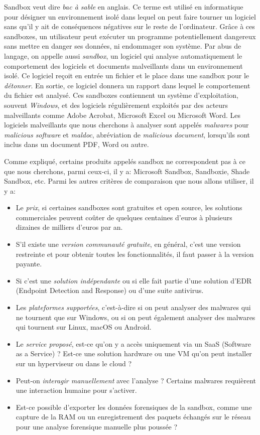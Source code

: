 Sandbox veut dire \textit{bac à sable} en anglais. Ce terme est utilisé en informatique pour désigner un environnement isolé dans lequel on peut faire tourner un logiciel sans qu'il y ait de conséquences négatives sur le reste de l'ordinateur. Grâce à ces sandboxes, un utilisateur peut exécuter un programme potentiellement dangereux sans mettre en danger ses données, ni endommager son système. Par abus de langage, on appelle aussi \textit{sandbox}, un logiciel qui analyse automatiquement le comportement des logiciels et documents malveillants dans un environnement isolé. Ce logiciel reçoit en entrée un fichier et le place dans une sandbox pour le \textit{détonner}. En sortie, ce logiciel donnera un rapport dans lequel le comportement du fichier est analysé. Ces sandboxes contiennent un système d'exploitation, souvent \textit{Windows}, et des logiciels régulièrement exploités par des acteurs malveillants comme Adobe Acrobat, Microsoft Excel ou Microsoft Word. Les logiciels malveillants que nous cherchons à analyser sont appelés \textit{malwares} pour \textit{malicious software} et \textit{maldoc}, abréviation de \textit{malicious document}, lorsqu'ils sont inclus dans un document PDF, Word ou autre.

Comme expliqué, certains produits appelés sandbox ne correspondent pas à ce que nous cherchons, parmi ceux-ci, il y a: Microsoft Sandbox, Sandboxie, Shade Sandbox, etc. Parmi les autres critères de comparaison que nous allons utiliser, il y a:
\begin{itemize}
    \item Le \textit{prix}, si certaines sandboxes sont gratuites et open source, les solutions commerciales peuvent coûter de quelques centaines d'euros à plusieurs dizaines de milliers d'euros par an.
    \item S'il existe une \textit{version communauté gratuite}, en général, c'est une version restreinte et pour obtenir toutes les fonctionnalités, il faut passer à la version payante.
    \item Si c'est une \textit{solution indépendante} ou si elle fait partie d'une solution d'EDR (Endpoint Detection and Response) ou d'une suite antivirus.
    \item Les \textit{plateformes supportées}, c'est-à-dire si on peut analyser des malwares qui ne tournent que sur Windows, ou si on peut également analyser des malwares qui tournent sur Linux, macOS ou Android.
    \item Le \textit{service proposé}, est-ce qu'on y a accès uniquement via un SaaS (Software as a Service) ? Est-ce une solution hardware ou une VM qu'on peut installer sur un hyperviseur ou dans le cloud ?
    \item Peut-on \textit{interagir manuellement} avec l'analyse ? Certains malwares requièrent une interaction humaine pour s'activer.
    \item Est-ce possible d'exporter les données forensiques de la sandbox, comme une capture de la RAM ou un enregistrement des paquets échangés sur le réseau pour une analyse forensique manuelle plus poussée ?
\end{itemize}

